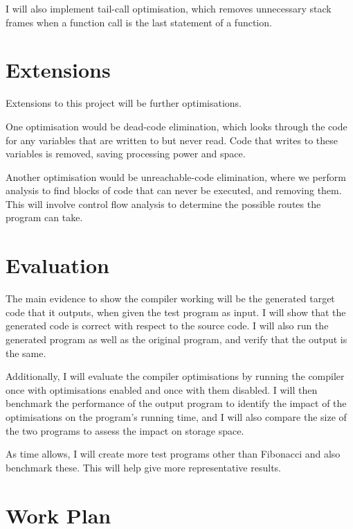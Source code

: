 I will also implement tail-call optimisation, which removes unnecessary stack frames when a function call is the last statement of a function.

\section*{Extensions}

Extensions to this project will be further optimisations.

One optimisation would be dead-code elimination, which looks through the code for any variables that are written to but never read. Code that writes to these variables is removed, saving processing power and space.

Another optimisation would be unreachable-code elimination, where we perform analysis to find blocks of code that can never be executed, and removing them. This will involve control flow analysis to determine the possible routes the program can take.


\section*{Evaluation}

The main evidence to show the compiler working will be the generated target code that it outputs, when given the test program as input. I will show that the generated code is correct with respect to the source code. I will also run the generated program as well as the original program, and verify that the output is the same.

Additionally, I will evaluate the compiler optimisations by running the compiler once with optimisations enabled and once with them disabled. I will then benchmark the performance of the output program to identify the impact of the optimisations on the program's running time, and I will also compare the size of the two programs to assess the impact on storage space.

As time allows, I will create more test programs other than Fibonacci and also benchmark these. This will help give more representative results.

\section*{Work Plan}

